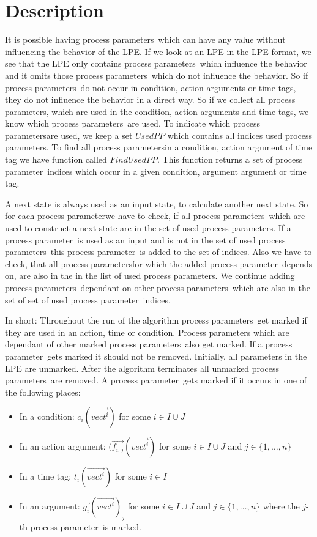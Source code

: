 \documentclass[a4paper,10pt]{article}
\theoremstyle{plain}
\theoremstyle{definition}
\newcommand{\ovr}{\overrightarrow}
\newcommand{\pp}{process parameter}
\newcommand{\pps}{process parameters}
\begin{document}
\section{Description} \label{sec:desc}
It is possible having \pps\ which can have any value without influencing the behavior of the LPE. 
If we look at an LPE in the LPE-format, we see that the LPE only contains \pps\ which influence the behavior and it omits those \pps\ which do not influence the behavior. So if \pps\ do not occur in condition, action arguments or time tags, they do not influence the behavior in a direct way. So if we collect all \pps , which are used in the condition, action arguments and time tags, we know which \pps\ are used. To indicate which \pps are used, we keep a set $UsedPP$ which contains all indices used \pps . To find all \pps in a condition, action argument of time tag we have function called $FindUsedPP$. This function returns a set of  \pp\ indices which occur in a given condition, argument argument or time tag. 

A next state is always used as an input state, to calculate another next state. So for each \pp we have to check, if all \pps\ which are used to construct a next state are in the set of used \pps . If a \pp\ is used as an input and is not in the set of used \pps\ this \pp\ is added to the set of indices. 
Also we have to check, that all \pps for which the added \pp\ depends on, are also in the in the list of used \pps. We continue adding \pps\ dependant on other \pps\ which are also in the set of set of used \pp\ indices.

In short: Throughout the run of the algorithm \pps\ get marked if they are used in an action, time or condition. Process parameters which are dependant of other marked \pps\ also get marked. If a \pp\ gets marked it should not be removed. Initially, all parameters in the LPE are unmarked. After the algorithm terminates all unmarked \pps\ are removed. A \pp\ gets marked if it occurs in one of the following places:

\begin{itemize}
\item In a condition: $c_i(\ovr{vect^i})$ for some $i \in I \cup J$
\item In an action argument: %
$(\ovr{f_{i,j}}(\ovr{vect^i})$ for some $i \in I \cup J$ and $j \in \lbrace 1, \ldots , n \rbrace$
\item In a time tag: $t_i(\ovr{vect^i})$ for some $i \in I$
\item In an argument: $\ovr{g_i}(\ovr{vect^i})_j$ for some $i \in I \cup J$ and $j \in \lbrace 1, \ldots , n \rbrace $ where the $j$-th \pp\ is marked.
\end{itemize}
\end{document}
